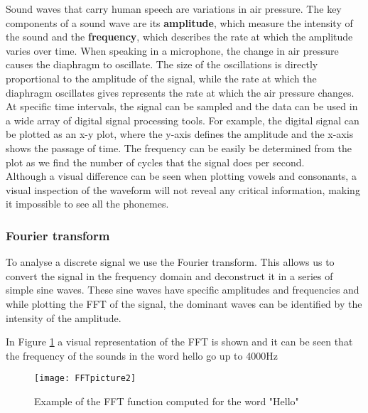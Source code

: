 Sound waves that carry human speech are variations in air pressure. The key components of a sound wave are its \textbf{amplitude}, which measure the intensity of the sound and the \textbf{frequency}, which describes the rate at which the amplitude varies over time. When speaking in a microphone, the change in air pressure causes the diaphragm to oscillate. The size of the oscillations is directly proportional to the amplitude of the signal, while the rate at which the diaphragm oscillates gives represents the rate at which the air pressure changes. At specific time intervals, the signal can be sampled and the data can be used in a wide array of digital signal processing tools. For example, the digital signal can be plotted as an x-y plot, where the y-axis defines the amplitude and the x-axis shows the passage of time. The frequency can be easily be determined from the plot as we find the number of cycles that the signal does per second.\\

Although a visual difference can be seen when plotting vowels and consonants, a visual inspection of the waveform will not reveal any critical information, making it impossible to see all the phonemes.\\

\subsubsection{ Fourier transform}

To analyse a discrete signal we use the Fourier transform. This allows us to convert the signal in the frequency domain and deconstruct it in a series of simple sine waves. These sine waves have specific amplitudes and frequencies and while plotting the FFT of the signal, the dominant waves can be identified by the intensity of the amplitude.

In Figure \ref{fig:FFT} a visual representation of the FFT is shown and it can be seen that the frequency of the sounds in the word hello go up to 4000Hz 
\begin{figure}
\texttt{[image: FFTpicture2]}
\centering
\caption{Example of the FFT function computed for the word "Hello"}
\label{fig:FFT}
\end{figure}

